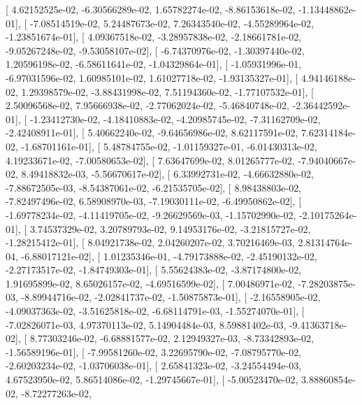 \documentclass{article}
\begin{document}
       [  4.62152525e-02,  -6.30566289e-02,   1.65782274e-02,
         -8.86153618e-02,  -1.13448862e-01],
       [ -7.08514519e-02,   5.24487673e-02,   7.26343540e-02,
         -4.55289964e-02,  -1.23851674e-01],
       [  4.09367518e-02,  -3.28957838e-02,  -2.18661781e-02,
         -9.05267248e-02,  -9.53058107e-02],
       [ -6.74370976e-02,  -1.30397440e-02,   1.20596198e-02,
         -6.58611641e-02,  -1.04329864e-01],
       [ -1.05931996e-01,  -6.97031596e-02,   1.60985101e-02,
          1.61027718e-02,  -1.93135327e-01],
       [  4.94146188e-02,   1.29398579e-02,  -3.88431998e-02,
          7.51194360e-02,  -1.77107532e-01],
       [  2.50096568e-02,   7.95666938e-02,  -2.77062024e-02,
         -5.46840748e-02,  -2.36442592e-01],
       [ -1.23412730e-02,  -4.18410883e-02,  -4.20985745e-02,
         -7.31162709e-02,  -2.42408911e-01],
       [  5.40662240e-02,  -9.64656986e-02,   8.62117591e-02,
          7.62314184e-02,  -1.68701161e-01],
       [  5.48784755e-02,  -1.01159327e-01,  -6.01430313e-02,
          4.19233671e-02,  -7.00580653e-02],
       [  7.63647699e-02,   8.01265777e-02,  -7.94040667e-02,
          8.49418832e-03,  -5.56670617e-02],
       [  6.33992731e-02,  -4.66632880e-02,  -7.88672505e-03,
         -8.54387061e-02,  -6.21535705e-02],
       [  8.98438803e-02,  -7.82497496e-02,   6.58908970e-03,
         -7.19030111e-02,  -6.49950862e-02],
       [ -1.69778234e-02,  -4.11419705e-02,  -9.26629569e-03,
         -1.15702990e-02,  -2.10175264e-01],
       [  3.74537329e-02,   3.20789793e-02,   9.14953176e-02,
         -3.21815727e-02,  -1.28215412e-01],
       [  8.04921738e-02,   2.04260207e-02,   3.70216469e-03,
          2.81314764e-04,  -6.88017121e-02],
       [  1.01235346e-01,  -4.79173888e-02,  -2.45190132e-02,
         -2.27173517e-02,  -1.84749303e-01],
       [  5.55624383e-02,  -3.87174800e-02,   1.91695899e-02,
          8.65026157e-02,  -4.69516599e-02],
       [  7.00486971e-02,  -7.28203875e-03,  -8.89944716e-02,
         -2.02841737e-02,  -1.50875873e-01],
       [ -2.16558905e-02,  -4.09037363e-02,  -3.51625818e-02,
         -6.68114791e-03,  -1.55274070e-01],
       [ -7.02826071e-03,   4.97370113e-02,   5.14904484e-03,
          8.59881402e-03,  -9.41363718e-02],
       [  8.77303246e-02,  -6.68881577e-02,   2.12949327e-03,
         -8.73342893e-02,  -1.56589196e-01],
       [ -7.99581260e-02,   3.22695790e-02,  -7.08795770e-02,
         -2.60203234e-02,  -1.03706038e-01],
       [  2.65841323e-02,  -3.24554494e-03,   4.67523950e-02,
          5.86514086e-02,  -1.29745667e-01],
       [ -5.00523470e-02,   3.88860854e-02,  -8.72277263e-02,
\end{document}
